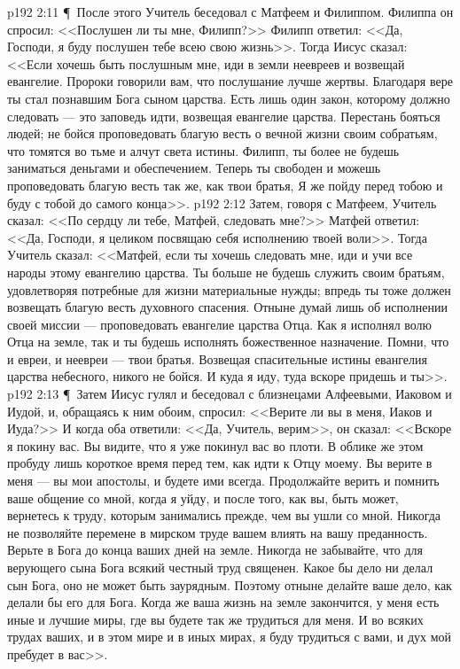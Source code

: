 \vs p192 2:11 \P\ После этого Учитель беседовал с Матфеем и Филиппом. Филиппа он спросил: <<Послушен ли ты мне, Филипп?>> Филипп ответил: <<Да, Господи, я буду послушен тебе всею свою жизнь>>. Тогда Иисус сказал: <<Если хочешь быть послушным мне, иди в земли неевреев и возвещай евангелие. Пророки говорили вам, что послушание лучше жертвы. Благодаря вере ты стал познавшим Бога сыном царства. Есть лишь один закон, которому должно следовать --- это заповедь идти, возвещая евангелие царства. Перестань бояться людей; не бойся проповедовать благую весть о вечной жизни своим собратьям, что томятся во тьме и алчут света истины. Филипп, ты более не будешь заниматься деньгами и обеспечением. Теперь ты свободен и можешь проповедовать благую весть так же, как твои братья, Я же пойду перед тобою и буду с тобой до самого конца>>.
\vs p192 2:12 Затем, говоря с Матфеем, Учитель сказал: <<По сердцу ли тебе, Матфей, следовать мне?>> Матфей ответил: <<Да, Господи, я целиком посвящаю себя исполнению твоей воли>>. Тогда Учитель сказал: <<Матфей, если ты хочешь следовать мне, иди и учи все народы этому евангелию царства. Ты больше не будешь служить своим братьям, удовлетворяя потребные для жизни материальные нужды; впредь ты тоже должен возвещать благую весть духовного спасения. Отныне думай лишь об исполнении своей миссии --- проповедовать евангелие царства Отца. Как я исполнял волю Отца на земле, так и ты будешь исполнять божественное назначение. Помни, что и евреи, и неевреи --- твои братья. Возвещая спасительные истины евангелия царства небесного, никого не бойся. И куда я иду, туда вскоре придешь и ты>>.
\vs p192 2:13 \P\ Затем Иисус гулял и беседовал с близнецами Алфеевыми, Иаковом и Иудой, и, обращаясь к ним обоим, спросил: <<Верите ли вы в меня, Иаков и Иуда?>> И когда оба ответили: <<Да, Учитель, верим>>, он сказал: <<Вскоре я покину вас. Вы видите, что я уже покинул вас во плоти. В облике же этом пробуду лишь короткое время перед тем, как идти к Отцу моему. Вы верите в меня --- вы мои апостолы, и будете ими всегда. Продолжайте верить и помнить ваше общение со мной, когда я уйду, и после того, как вы, быть может, вернетесь к труду, которым занимались прежде, чем вы ушли со мной. Никогда не позволяйте перемене в мирском труде вашем влиять на вашу преданность. Верьте в Бога до конца ваших дней на земле. Никогда не забывайте, что для верующего сына Бога всякий честный труд священен. Какое бы дело ни делал сын Бога, оно не может быть заурядным. Поэтому отныне делайте ваше дело, как делали бы его для Бога. Когда же ваша жизнь на земле закончится, у меня есть иные и лучшие миры, где вы будете так же трудиться для меня. И во всяких трудах ваших, и в этом мире и в иных мирах, я буду трудиться с вами, и дух мой пребудет в вас>>.
